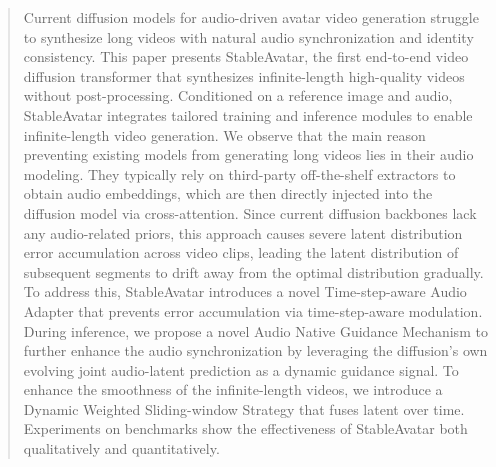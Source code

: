 \begin{abstract}
Current diffusion models for audio-driven avatar video generation struggle to synthesize long videos with natural audio synchronization and identity consistency. This paper presents StableAvatar, the first end-to-end video diffusion transformer that synthesizes infinite-length high-quality videos without post-processing. Conditioned on a reference image and audio, StableAvatar integrates tailored training and inference modules to enable infinite-length video generation. 
We observe that the main reason preventing existing models from generating long videos lies in their audio modeling. They typically rely on third-party off-the-shelf extractors to obtain audio embeddings, which are then directly injected into the diffusion model via cross-attention. Since current diffusion backbones lack any audio-related priors, this approach causes severe latent distribution error accumulation across video clips, leading the latent distribution of subsequent segments to drift away from the optimal distribution gradually.
To address this, StableAvatar introduces a novel Time-step-aware Audio Adapter that prevents error accumulation via time-step-aware modulation. During inference, we propose a novel Audio Native Guidance Mechanism to further enhance the audio synchronization by leveraging the diffusion’s own evolving joint audio-latent prediction as a dynamic guidance signal. To enhance the smoothness of the infinite-length videos, we introduce a Dynamic Weighted Sliding-window Strategy that fuses latent over time. Experiments on benchmarks show the effectiveness of StableAvatar both qualitatively and quantitatively. 

\end{abstract}